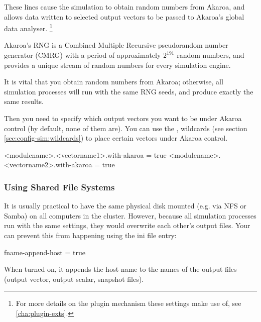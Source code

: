 These lines cause the simulation to obtain random numbers from Akaroa,
and allows data written to selected output vectors to be passed to Akaroa's
global data analyser.
    \footnote{For more details on the plugin mechanism these settings make use of,
    see \ref{cha:plugin-exts}.}

Akaroa's RNG is a Combined Multiple Recursive pseudorandom
number generator (CMRG) with a period of approximately $2^{191}$
random numbers, and provides a unique stream of random numbers
for every simulation engine.

\begin{note}
It is vital that you obtain random numbers from Akaroa; otherwise,
all simulation processes will run with the same RNG seeds, and
produce exactly the same results.
\end{note}

Then you need to specify which output vectors you want to
be under Akaroa control (by default, none of them are).
You can use the \ttt{*}, \ttt{**} wildcards (see
section \ref{sec:config-sim:wildcards}) to
place certain vectors under Akaroa control.

\begin{inifile}
<modulename>.<vectorname1>.with-akaroa = true
<modulename>.<vectorname2>.with-akaroa = true
\end{inifile}


\subsubsection{Using Shared File Systems}
\label{sec:run-sim:akaroa-using-shared-filesystems}

It is usually practical to have the same physical disk mounted (e.g. via NFS or
Samba) on all computers in the cluster. However, because all {\opp} simulation
processes run with the same settings, they would overwrite each other's
output files. Your can prevent this from happening using the
 ini file entry:

\begin{inifile}
[General]
fname-append-host = true
\end{inifile}

When turned on, it appends the host name to the names of the output
files (output vector, output scalar, snapshot files).



